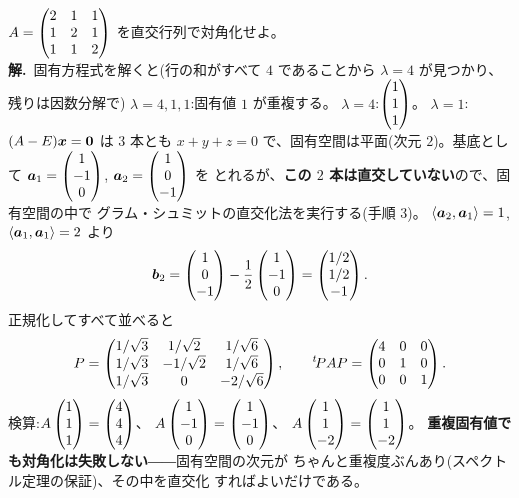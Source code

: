 \begin{rei}\label{rei:spec-repeated}
$A = \begin{pmatrix}2 & 1 & 1 \\ 1 & 2 & 1 \\ 1 & 1 & 2\end{pmatrix}$ を直交行列で対角化せよ。\\
\textbf{解.}\ 固有方程式を解くと(行の和がすべて $4$ であることから
$\lambda = 4$ が見つかり、残りは因数分解で)
$\lambda = 4, 1, 1$:固有値 $1$ が重複する。
$\lambda = 4$:$\begin{pmatrix}1 \\ 1 \\ 1\end{pmatrix}$。
$\lambda = 1$:$(A - E)\bm{x} = \bm{0}$ は $3$ 本とも
$x + y + z = 0$ で、固有空間は平面(次元 $2$)。基底として
$\bm{a}_1 = \begin{pmatrix}1 \\ -1 \\ 0\end{pmatrix}$, $\bm{a}_2 = \begin{pmatrix}1 \\ 0 \\ -1\end{pmatrix}$ を
とれるが、\textbf{この $2$ 本は直交していない}ので、固有空間の中で
グラム・シュミットの直交化法を実行する(手順 3)。
$\langle \bm{a}_2, \bm{a}_1 \rangle = 1$,
$\langle \bm{a}_1, \bm{a}_1 \rangle = 2$ より
\[
\bm{b}_2 = \begin{pmatrix}1 \\ 0 \\ -1\end{pmatrix} - \frac{1}{2}\begin{pmatrix}1 \\ -1 \\ 0\end{pmatrix}
= \begin{pmatrix}1/2 \\ 1/2 \\ -1\end{pmatrix}.
\]
正規化してすべて並べると
\[
P = \begin{pmatrix}1/\sqrt{3} & 1/\sqrt{2} & 1/\sqrt{6} \\
1/\sqrt{3} & -1/\sqrt{2} & 1/\sqrt{6} \\
1/\sqrt{3} & 0 & -2/\sqrt{6}\end{pmatrix}, \qquad
{}^t\!PAP = \begin{pmatrix}4 & 0 & 0 \\ 0 & 1 & 0 \\ 0 & 0 & 1\end{pmatrix}.
\]
検算:$A\begin{pmatrix}1 \\ 1 \\ 1\end{pmatrix} = \begin{pmatrix}4 \\ 4 \\ 4\end{pmatrix}$、
$A\begin{pmatrix}1 \\ -1 \\ 0\end{pmatrix} = \begin{pmatrix}1 \\ -1 \\ 0\end{pmatrix}$、
$A\begin{pmatrix}1 \\ 1 \\ -2\end{pmatrix} = \begin{pmatrix}1 \\ 1 \\ -2\end{pmatrix}$。
\textbf{重複固有値でも対角化は失敗しない}――固有空間の次元が
ちゃんと重複度ぶんあり(スペクトル定理の保証)、その中を直交化
すればよいだけである。
\end{rei}

